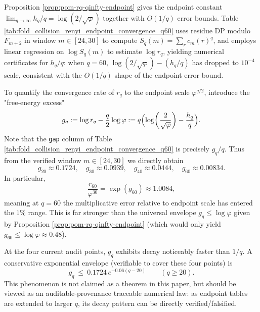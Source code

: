 \begin{remark}[Endpoint convergence rate (auditable): \texorpdfstring{$h_q/q\to\log(2/\sqrt{\varphi})$}{hq/q->log(2/sqrt(phi))} for \texorpdfstring{$q\le 60$}{q<=60}]\label{rem:pom-renyi-endpoint-q60}
Proposition \ref{prop:pom-rq-qinfty-endpoint} gives the endpoint constant
\(
\lim_{q\to\infty}h_q/q=\log(2/\sqrt{\varphi})
\)
together with \(O(1/q)\) error bounds.
Table \ref{tab:fold_collision_renyi_endpoint_convergence_q60} uses residue DP modulo \(F_{m+2}\) in window \(m\in[24,30]\) to compute \(S_q(m)=\sum_r c_m(r)^q\), and employs linear regression on \(\log S_q(m)\) to estimate \(\log r_q\), yielding numerical certificates for \(h_q/q\):
when \(q=60\), \(\log(2/\sqrt{\varphi})-(h_q/q)\) has dropped to \(10^{-4}\) scale, consistent with the \(O(1/q)\) shape of the endpoint error bound.
\end{remark}


\begin{remark}\label{rem:pom-free-energy-excess-gq}
To quantify the convergence rate of \(r_q\) to the endpoint scale \(\varphi^{q/2}\), introduce the "free-energy excess"
\[
g_q:=\log r_q-\frac{q}{2}\log\varphi
:= q\Bigl(\log\!\left(\frac{2}{\sqrt{\varphi}}\right)-\frac{h_q}{q}\Bigr).
\]
Note that the \texttt{gap} column of Table \ref{tab:fold_collision_renyi_endpoint_convergence_q60} is precisely \(g_q/q\).
Thus from the verified window \(m\in[24,30]\) we directly obtain
\[
g_{20}\approx 0.1724,\quad g_{30}\approx 0.0939,\quad g_{40}\approx 0.0444,\quad g_{60}\approx 0.00834.
\]
In particular,
\[
\frac{r_{60}}{\varphi^{30}}=\exp(g_{60})\approx 1.0084,
\]
meaning at \(q=60\) the multiplicative error relative to endpoint scale has entered the \(1\%\) range.
This is far stronger than the universal envelope \(g_q\le \log\varphi\) given by Proposition \ref{prop:pom-rq-qinfty-endpoint} (which would only yield \(g_{60}\le\log\varphi\approx 0.48\)).
\par
At the four current audit points, \(g_q\) exhibits decay noticeably faster than \(1/q\).
A conservative exponential envelope (verifiable to cover these four points) is
\[
g_q\ \le\ 0.1724\,e^{-0.06(q-20)}\qquad(q\ge 20).
\]
This phenomenon is not claimed as a theorem in this paper, but should be viewed as an auditable-provenance traceable numerical law: as endpoint tables are extended to larger \(q\), its decay pattern can be directly verified/falsified.
\end{remark}

